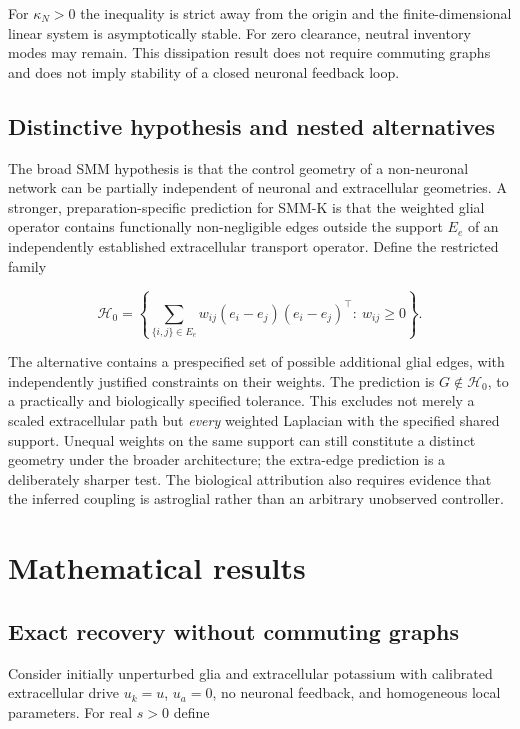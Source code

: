 \documentclass[
  11pt,
]{article}
\begin{document}
For \(\kappa_N>0\) the inequality is strict away from the origin and the
finite-dimensional linear system is asymptotically stable. For zero
clearance, neutral inventory modes may remain. This dissipation result
does not require commuting graphs and does not imply stability of a
closed neuronal feedback loop.

\subsection{Distinctive hypothesis and nested
alternatives}\label{distinctive-hypothesis-and-nested-alternatives}

The broad SMM hypothesis is that the control geometry of a non-neuronal
network can be partially independent of neuronal and extracellular
geometries. A stronger, preparation-specific prediction for SMM-K is
that the weighted glial operator contains functionally non-negligible
edges outside the support \(E_e\) of an independently established
extracellular transport operator. Define the restricted family

\[\mathcal H_0=\left\{\sum_{\{i,j\}\in E_e}w_{ij}(e_i-e_j)(e_i-e_j)^\top:\ w_{ij}\geq0\right\}.\]

The alternative contains a prespecified set of possible additional glial
edges, with independently justified constraints on their weights. The
prediction is \(G\notin\mathcal H_0\), to a practically and biologically
specified tolerance. This excludes not merely a scaled extracellular
path but \emph{every} weighted Laplacian with the specified shared
support. Unequal weights on the same support can still constitute a
distinct geometry under the broader architecture; the extra-edge
prediction is a deliberately sharper test. The biological attribution
also requires evidence that the inferred coupling is astroglial rather
than an arbitrary unobserved controller.

\section{Mathematical results}\label{mathematical-results}

\subsection{Exact recovery without commuting
graphs}\label{exact-recovery-without-commuting-graphs}

Consider initially unperturbed glia and extracellular potassium with
calibrated extracellular drive \(u_k=u\), \(u_a=0\), no neuronal
feedback, and homogeneous local parameters. For real \(s>0\) define
\end{document}

